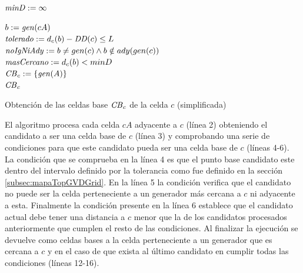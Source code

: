 \begin{algorithm}[H]
\SetAlgoLined


  $\mathit{minD} := \infty$

   {
    $b := \mathit{gen}(cA)$\\
    $\mathit{tolerado} := d_c(b) - \mathit{DD}(c) \leq L$\\
    $\mathit{noIgNiAdy} := b \neq gen(c) \land b \notin ady(gen(c))$\\
    $\mathit{masCercano} := d_c(b) < minD$\\
  }
  $\mathit{CB}_c := \{\mathit{gen}(A)\}$\\
  \Return $\mathit{CB}_c$ 

  \caption{Obtención de las celdas base $\mathit{CB}_c$ de la celda $c$ (simplificada)}
  \label{alg:celdasBase}
\end{algorithm}

El algoritmo procesa cada celda $cA$ adyacente a $c$ (línea 2) obteniendo el
candidato a ser una celda base de $c$ (línea 3) y comprobando una serie de
condiciones para que este candidato pueda ser una celda base de $c$ (líneas
4-6). La condición que se comprueba en la línea 4 es que el punto base
candidato este dentro del intervalo definido por la tolerancia como fue
definido en la sección \ref{subsec:mapaTopGVDGrid}. En la línea 5 la condición
verifica que el candidato no puede ser la celda perteneciente a un generador
más cercana a $c$ ni adyacente a esta. Finalmente la condición presente en la
línea 6 establece que el candidato actual debe tener una distancia a $c$ menor
que la de los candidatos procesados anteriormente que cumplen el resto de las
condiciones. Al finalizar la ejecución se devuelve como celdas bases a la celda
perteneciente a un generador que es cercana a $c$ y en el caso de que exista al
último candidato en cumplir todas las condiciones (líneas 12-16).


